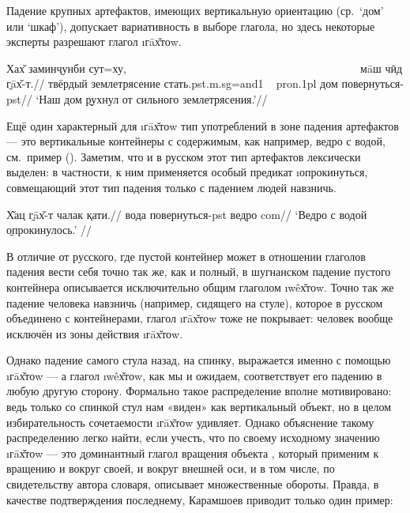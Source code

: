 Падение крупных артефактов, имеющих вертикальную ориентацию (ср.~‘дом’ или ‘шкаф’), допускает вариативность в выборе глагола, но здесь некоторые эксперты разрешают глагол \i{гāх̌тоw}.

\begingl
\gla Хах̌ заминҷунби сут=ху, ~~~~~~~~~~~~~~~~~~~~~~~~~~~~~~~~~~~~~~~~~ мāш чӣд \b{гāх̌-т}.//
\glc твёрдый землетрясение стать.{\sc pst.m.sg=and1} ~ {\sc pron.1pl} дом повернуться-{\sc pst}//
\glft ‘Наш дом \b{рухнул} от сильного землетрясения.’//
\endgl \xe

Ещё один характерный для \i{гāх̌тоw} тип употреблений в зоне падения артефактов — это вертикальные контейнеры с содержимым, как например, ведро с водой, см.~пример (). Заметим, что и в русском этот тип артефактов лексически выделен: в частности, к ним применяется особый предикат \i{опрокинуться}, совмещающий этот тип падения только с падением людей навзничь.

\begingl
\gla Х̌ац \b{гāх̌-т} чалак қати.//
\glc вода повернуться-{\sc pst} ведро {\sc com}//
\glft ‘Ведро с водой \b{опрокинулось}.’ //
\endgl \xe

В отличие от русского, где пустой контейнер может в отношении глаголов падения вести себя точно так же, как и полный, в шугнанском падение пустого контейнера описывается исключительно общим глаголом \i{wêх̌тоw}. Точно так же падение человека навзничь (например, сидящего на стуле), которое в русском объединено с контейнерами, глагол \i{гāх̌тоw} тоже не покрывает: человек вообще исключён из зоны действия \i{гāх̌тоw}.

\pagebreak[4]

Однако падение самого стула назад, на спинку, выражается именно с помощью \i{гāх̌тоw} — а глагол \i{wêх̌тоw}, как мы и ожидаем, соответствует его падению в любую другую сторону. Формально такое распределение вполне мотивировано: ведь только со спинкой стул нам «виден» как вертикальный объект, но в целом избирательность сочетаемости \i{гāх̌тоw} удивляет. Однако объяснение такому распределению легко найти, если учесть, что по своему исходному значению \i{гāх̌тоw} — это \b{доминантный глагол вращения объекта} \parencite[387]{karamshoev1988}, который применим к вращению и вокруг своей, и вокруг внешней оси, и в том числе, по свидетельству автора словаря, описывает множественные обороты. Правда, в качестве подтверждения последнему, Карамшоев приводит только один пример:

